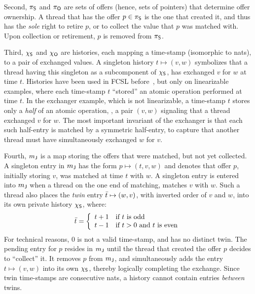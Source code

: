 Second, $\pi_{\mathsf{S}}$ and $\pi_{\mathsf{O}}$ are sets of offers (hence, sets of
pointers) that determine offer ownership. A thread that has the offer
$p \in \pi_{\mathsf{S}}$ is the one that created it, and thus has the
\emph{sole} right to retire $p$, or to collect the value that $p$ was
matched with. Upon collection or retirement, $p$ is removed from
$\pi_{\mathsf{S}}$.


Third, $\chi_{\mathsf{S}}$ and $\chi_{\mathsf{O}}$ are histories, each mapping a time-stamp
(isomorphic to nats), to a pair of exchanged values. A singleton
history $t \mapsto (v, w)$ symbolizes that a thread having this
singleton as a subcomponent of $\chi_{\mathsf{S}}$, has exchanged $v$ for $w$ at
time $t$. Histories have been used in FCSL
before~\cite{Sergey-al:ESOP15}, but only on linearizable examples,
where each time-stamp $t$ ``stored'' an atomic operation performed at
time $t$. In the exchanger example, which is not linearizable, a
time-stamp $t$ stores only a \emph{half} of an atomic operation, \ie,
a pair $(v, w)$ signaling that a thread exchanged $v$ for $w$. The
most important invariant of the exchanger is that each such half-entry
is matched by a symmetric half-entry, to capture that another thread
must have simultaneously exchanged $w$ for $v$.

Fourth, ${m_{\mathsf{J}}}$ is a map storing the offers that were matched, but
not yet collected. A singleton entry in ${m_{\mathsf{J}}}$ has the form $p
\mapsto (t, v, w)$ and denotes that offer $p$, initially storing $v$,
was matched at time $t$ with $w$. A singleton entry is entered into
${m_{\mathsf{J}}}$ when a thread on the one end of matching, matches $v$ with
$w$. Such a thread also places the \emph{twin} entry $\bar{t} \mapsto
(w, v)$, with inverted order of $v$ and $w$, into its own private
history $\chi_{\mathsf{S}}$, where:
\[
\twin{t} = \left\{%
\begin{array}{ll}
t+1 & \mbox{if $t$ is odd}\\
t-1 & \mbox{if $t > 0$ and $t$ is even}
\end{array}\right.
\]
For technical reasons, $0$ is not a valid time-stamp, and has no
distinct twin. The pending entry for $p$ resides in ${m_{\mathsf{J}}}$ until
the thread that created the offer $p$ decides to ``collect'' it. It
removes $p$ from ${m_{\mathsf{J}}}$, and simultaneously adds the entry $t
\mapsto (v, w)$ into its own $\chi_{\mathsf{S}}$, thereby logically completing
the exchange. Since twin time-stamps are consecutive nats, a history
cannot contain entries \emph{between} twins.

